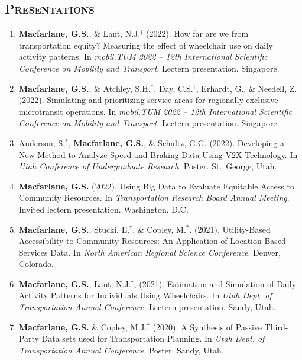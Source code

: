 \documentclass[margin,line]{res}
\newif\ifdetail
\newcounter{enuminitialize}
\newenvironment{myenum}[1][]
{%
 \setcounter{enuminitialize}{#1}
 \addtocounter{enuminitialize}{2}
 \begin{enumerate}[left= 4pt, itemsep=12pt, start=\value{enuminitialize}, label=\arabic*\addtocounter{enumi}{-2}]
}
{%
 \end{enumerate}
}
\newcommand{\secfont}{\scshape }
\begin{document}
\begin{resume}
\section{\secfont Presentations}
\ifdetail This includes invited presentations to academic and non-academic audiences, as
well as presentations resulting from abstract-only submission. Includes both
lectern sessions and posters. Item 1 came from my undergraduate honors thesis, items 2 through 4 from doctoral research,
items 5 through 10 from my work as a consultant, and items 11 through 20 respresent work
completed during my time at BYU.\fi
\vspace{0.3cm}
\begin{myenum}[20]
\item \textbf{Macfarlane, G.S.}, \& Lant, N.J.$^\dagger$ (2022). How far are we from transportation equity? Measuring the effect of wheelchair use on daily activity patterns. In \textit{mobil.TUM 2022 – 12th International Scientific Conference on Mobility and Transport}. Lectern presentation. Singapore.
\item \textbf{Macfarlane, G.S.}, \& Atchley, S.H.$^*$, Day, C.S.$^\dagger$, Erhardt, G., \& Needell, Z. (2022). Simulating and prioritizing service areas for regionally exclusive microtransit operations. In \textit{mobil.TUM 2022 – 12th International Scientific Conference on Mobility and Transport}. Lectern presentation. Singapore.
\item Anderson, S.$^*$, \textbf{Macfarlane, G.S.}, \& Schultz, G.G. (2022). Developing a New Method to Analyze Speed and Braking Data Using V2X Technology. In \textit{Utah Conference of Undergraduate Research}. Poster. St.\ George, Utah.
\item \textbf{Macfarlane, G.S.} (2022). Using Big Data to Evaluate Equitable Access to Community Resources. In \textit{Transportation Research Board Annual Meeting}. Invited lectern presentation. Washington, D.C.
\item \textbf{Macfarlane, G.S.}, Stucki,  E.$^\dagger$,  \& Copley, M.$^*$. (2021). Utility-Based Accessibility to Community Resources: An Application of Location-Based Services Data. In \textit{North American Regional Science Conference}. Denver, Colorado.
\item \textbf{Macfarlane, G.S.}, Lant, N.J.$^\dagger$, (2021). Estimation and Simulation of Daily Activity Patterns for Individuals Using Wheelchairs. In \textit{Utah Dept. of Transportation Annual Conference.} Lectern presentation. Sandy, Utah.
\item \textbf{Macfarlane, G.S.} \& Copley, M.J.$^*$ (2020).  A Synthesis of Passive Third-Party Data sets used for Transportation Planning. In \textit{Utah Dept. of Transportation Annual Conference}. Poster. Sandy, Utah.

\end{myenum}
\end{resume}
\end{document}
